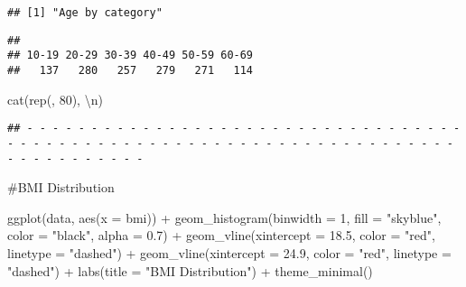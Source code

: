 \documentclass[
]{article}
\newenvironment{Shaded}{\begin{snugshade}}{\end{snugshade}}
\newcommand{\AttributeTok}[1]{\textcolor[rgb]{0.77,0.63,0.00}{#1}}
\newcommand{\DecValTok}[1]{\textcolor[rgb]{0.00,0.00,0.81}{#1}}
\newcommand{\FloatTok}[1]{\textcolor[rgb]{0.00,0.00,0.81}{#1}}
\newcommand{\FunctionTok}[1]{\textcolor[rgb]{0.00,0.00,0.00}{#1}}
\newcommand{\NormalTok}[1]{#1}
\newcommand{\OtherTok}[1]{\textcolor[rgb]{0.56,0.35,0.01}{#1}}
\newcommand{\SpecialCharTok}[1]{\textcolor[rgb]{0.00,0.00,0.00}{#1}}
\newcommand{\StringTok}[1]{\textcolor[rgb]{0.31,0.60,0.02}{#1}}
\begin{document}
\begin{verbatim}
## [1] "Age by category"
\end{verbatim}

\begin{Shaded}
\end{Shaded}

\begin{verbatim}
## 
## 10-19 20-29 30-39 40-49 50-59 60-69 
##   137   280   257   279   271   114
\end{verbatim}

\begin{Shaded}
\begin{Highlighting}[]
\FunctionTok{cat}\NormalTok{(}\FunctionTok{rep}\NormalTok{(}\StringTok{\textquotesingle{}{-}\textquotesingle{}}\NormalTok{, }\DecValTok{80}\NormalTok{), }\StringTok{\textquotesingle{}}\SpecialCharTok{\textbackslash{}n}\StringTok{\textquotesingle{}}\NormalTok{)}
\end{Highlighting}
\end{Shaded}

\begin{verbatim}
## - - - - - - - - - - - - - - - - - - - - - - - - - - - - - - - - - - - - - - - - - - - - - - - - - - - - - - - - - - - - - - - - - - - - - - - - - - - - - - - -
\end{verbatim}

\#BMI Distribution

\begin{Shaded}
\begin{Highlighting}[]
\FunctionTok{ggplot}\NormalTok{(data, }\FunctionTok{aes}\NormalTok{(}\AttributeTok{x =}\NormalTok{ bmi)) }\SpecialCharTok{+}
  \FunctionTok{geom\_histogram}\NormalTok{(}\AttributeTok{binwidth =} \DecValTok{1}\NormalTok{, }\AttributeTok{fill =} \StringTok{"skyblue"}\NormalTok{, }\AttributeTok{color =} \StringTok{"black"}\NormalTok{, }\AttributeTok{alpha =} \FloatTok{0.7}\NormalTok{) }\SpecialCharTok{+}
  \FunctionTok{geom\_vline}\NormalTok{(}\AttributeTok{xintercept =} \FloatTok{18.5}\NormalTok{, }\AttributeTok{color =} \StringTok{"red"}\NormalTok{, }\AttributeTok{linetype =} \StringTok{"dashed"}\NormalTok{) }\SpecialCharTok{+}
  \FunctionTok{geom\_vline}\NormalTok{(}\AttributeTok{xintercept =} \FloatTok{24.9}\NormalTok{, }\AttributeTok{color =} \StringTok{"red"}\NormalTok{, }\AttributeTok{linetype =} \StringTok{"dashed"}\NormalTok{) }\SpecialCharTok{+}
  \FunctionTok{labs}\NormalTok{(}\AttributeTok{title =} \StringTok{"BMI Distribution"}\NormalTok{) }\SpecialCharTok{+}
  \FunctionTok{theme\_minimal}\NormalTok{()}
\end{Highlighting}
\end{Shaded}
\end{document}
